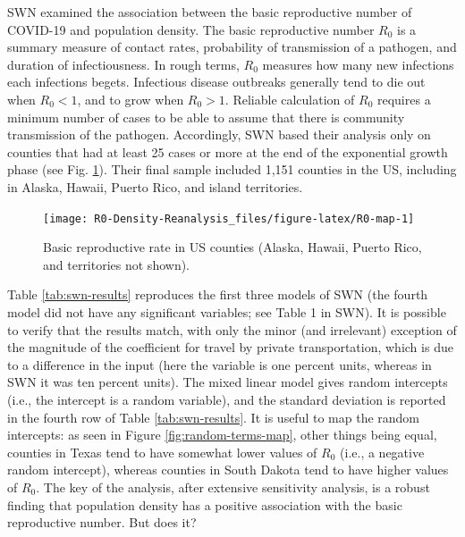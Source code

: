 \documentclass[]{elsarticle} %
\begin{document}
SWN examined the association between the basic reproductive number of
COVID-19 and population density. The basic reproductive number \(R_0\)
is a summary measure of contact rates, probability of transmission of a
pathogen, and duration of infectiousness. In rough terms, \(R_0\)
measures how many new infections each infections begets. Infectious
disease outbreaks generally tend to die out when \(R_0<1\), and to grow
when \(R_0>1\). Reliable calculation of \(R_0\) requires a minimum
number of cases to be able to assume that there is community
transmission of the pathogen. Accordingly, SWN based their analysis only
on counties that had at least 25 cases or more at the end of the
exponential growth phase (see Fig. \ref{fig:R0-map}). Their final sample
included 1,151 counties in the US, including in Alaska, Hawaii, Puerto
Rico, and island territories.

\begin{figure}
\texttt{[image: R0-Density-Reanalysis\_files/figure-latex/R0-map-1]} \caption{\label{fig:R0-map}Basic reproductive rate in US counties (Alaska, Hawaii, Puerto Rico, and territories not shown).}\label{fig:R0-map}
\end{figure}

Table \ref{tab:swn-results} reproduces the first three models of SWN
(the fourth model did not have any significant variables; see Table 1 in
SWN). It is possible to verify that the results match, with only the
minor (and irrelevant) exception of the magnitude of the coefficient for
travel by private transportation, which is due to a difference in the
input (here the variable is one percent units, whereas in SWN it was ten
percent units). The mixed linear model gives random intercepts (i.e.,
the intercept is a random variable), and the standard deviation is
reported in the fourth row of Table \ref{tab:swn-results}. It is useful
to map the random intercepts: as seen in Figure
\ref{fig:random-terms-map}, other things being equal, counties in Texas
tend to have somewhat lower values of \(R_0\) (i.e., a negative random
intercept), whereas counties in South Dakota tend to have higher values
of \(R_0\). The key of the analysis, after extensive sensitivity
analysis, is a robust finding that population density has a positive
association with the basic reproductive number. But does it?
\end{document}
